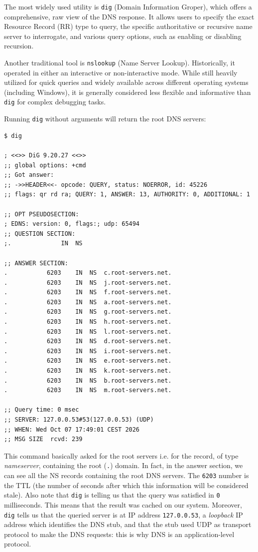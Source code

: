 The most widely used utility is \texttt{dig} (Domain Information Groper), which offers a comprehensive, raw view of the DNS response. 
It allows users to specify the exact Resource Record (RR) type to query, the specific authoritative or recursive name server to interrogate, and various query options, such as enabling or disabling recursion.

Another traditional tool is \texttt{nslookup} (Name Server Lookup). Historically, it operated in either an interactive or non-interactive mode. While still heavily utilized for quick queries and widely available across different operating systems (including Windows), it is generally considered less flexible and informative than \texttt{dig} for complex debugging tasks.

\begin{example}{}
    Running \texttt{dig} without arguments will return the root DNS servers:
    \begin{verbatim}
$ dig

; <<>> DiG 9.20.27 <<>>
;; global options: +cmd
;; Got answer:
;; ->>HEADER<<- opcode: QUERY, status: NOERROR, id: 45226
;; flags: qr rd ra; QUERY: 1, ANSWER: 13, AUTHORITY: 0, ADDITIONAL: 1

;; OPT PSEUDOSECTION:
; EDNS: version: 0, flags:; udp: 65494
;; QUESTION SECTION:
;.				IN	NS

;; ANSWER SECTION:
.			6203	IN	NS	c.root-servers.net.
.			6203	IN	NS	j.root-servers.net.
.			6203	IN	NS	f.root-servers.net.
.			6203	IN	NS	a.root-servers.net.
.			6203	IN	NS	g.root-servers.net.
.			6203	IN	NS	h.root-servers.net.
.			6203	IN	NS	l.root-servers.net.
.			6203	IN	NS	d.root-servers.net.
.			6203	IN	NS	i.root-servers.net.
.			6203	IN	NS	e.root-servers.net.
.			6203	IN	NS	k.root-servers.net.
.			6203	IN	NS	b.root-servers.net.
.			6203	IN	NS	m.root-servers.net.

;; Query time: 0 msec
;; SERVER: 127.0.0.53#53(127.0.0.53) (UDP)
;; WHEN: Wed Oct 07 17:49:01 CEST 2026
;; MSG SIZE  rcvd: 239
    \end{verbatim}
    This command basically asked for the root servers i.e. for the record, of type \emph{nameserver}, containing the root (\texttt{.}) domain.
    In fact, in the answer section, we can see all the NS records containing the root DNS servers.
    The \texttt{6203} number is the TTL (the number of seconds after which this information will be considered stale).
    Also note that \texttt{dig} is telling us that the query was satisfied in \texttt{0} milliseconds. This means that the result was cached on our system.
    Moreover, \texttt{dig} tells us that the queried server is at IP address \texttt{127.0.0.53}, a \emph{loopback} IP address which identifies the DNS stub, and that the stub used UDP as transport protocol to make the DNS requests: this is why DNS is an application-level protocol.
\end{example}

